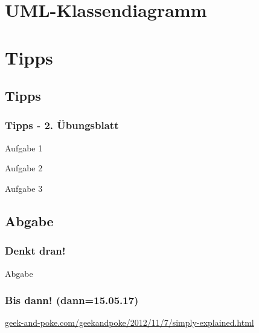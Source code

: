 \documentclass[18pt]{beamer}
\begin{document}
\section{UML-Klassendiagramm}
		
\section{Tipps}
	\subsection{Tipps}
	\begin{frame}
		\frametitle{Tipps - 2. Übungsblatt}
		\begin{small}
			\begin{exampleblock}{Aufgabe 1}
			\end{exampleblock}
			\pause
			\begin{exampleblock}{Aufgabe 2}
			\end{exampleblock}
			\pause
			\begin{exampleblock}{Aufgabe 3}
			\end{exampleblock}
		\end{small}
	\end{frame}
	
	\subsection{Abgabe}
	\begin{frame}
		\frametitle{Denkt dran!}
		\begin{alertblock}{Abgabe}
		\end{alertblock}
	\end{frame}
		
	\begin{frame}
		\frametitle{Bis dann! (dann=15.05.17)}
		\centering
		\tiny\url{geek-and-poke.com/geekandpoke/2012/11/7/simply-explained.html}
	\end{frame}
\end{document}

